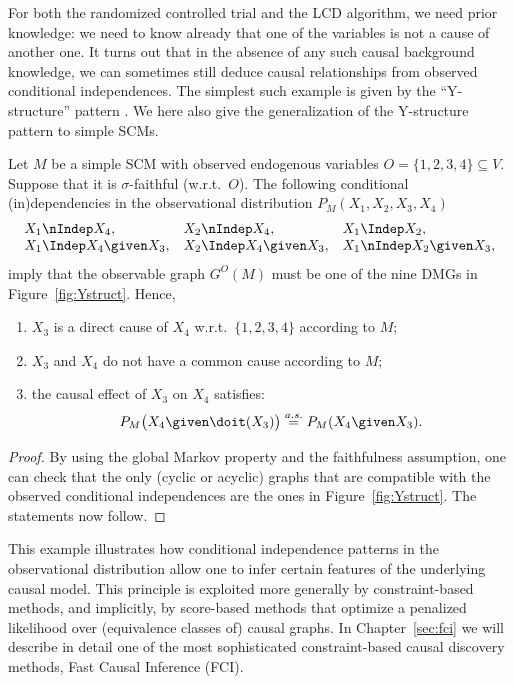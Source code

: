 For both the randomized controlled trial and the LCD algorithm, we need prior knowledge: we need to know already that one of the variables is not a cause of another one. 
It turns out that in the absence of any such causal background knowledge, we can sometimes still deduce causal relationships from observed conditional independences.
The simplest such example is given by the ``Y-structure'' pattern \cite{ManiPhD2006}.
We here also give the generalization of the Y-structure pattern to simple SCMs.
\begin{Prp}\label{prp:y-structures}
  Let $M$ be a simple SCM with observed endogenous variables $O = \{1,2,3,4\} \subseteq V$.
  Suppose that it is $\sigma$-faithful (w.r.t.\ $O$). 
  The following conditional (in)dependencies in the observational distribution $P_{M}(X_1,X_2,X_3,X_4)$
  $$\begin{array}{lll}
    X_1 \nIndep X_4,  & X_2 \nIndep X_4, & X_1 \Indep X_2, \\
    X_1 \Indep X_4 \given X_3, & X_2 \Indep X_4 \given X_3, & X_1 \nIndep X_2 \given X_3,
  \end{array}$$
  imply that the observable graph $G^O(M)$ must be one of the nine DMGs in Figure~\ref{fig:Ystruct}.
  Hence,
  \begin{enumerate}
    \item $X_3$ is a direct cause of $X_4$ w.r.t.\ $\{1,2,3,4\}$ according to $M$;
    \item $X_3$ and $X_4$ do not have a common cause according to $M$;
    \item the causal effect of $X_3$ on $X_4$ satisfies:
  \begin{equation}\label{eq:Y_causal_effect}
    P_{M}\big(X_4 \given \doit(X_3)\big) \stackrel{a.s.}{=} P_{M}(X_4 \given X_3).
  \end{equation}
  \end{enumerate}
\end{Prp}
\begin{proof}
By using the global Markov property and the faithfulness assumption, one
can check that the only (cyclic or acyclic) graphs that are compatible with the observed
conditional independences are the ones in Figure~\ref{fig:Ystruct}.
The statements now follow.
\end{proof}
This example illustrates how conditional independence patterns in the observational
distribution allow one to infer certain features of the underlying causal model. This
principle is exploited more generally by constraint-based methods, and implicitly,
by score-based methods that optimize a penalized likelihood over (equivalence classes of) causal graphs.
In Chapter~\ref{sec:fci} we will describe in detail one of the most sophisticated constraint-based
causal discovery methods, Fast Causal Inference (FCI).

